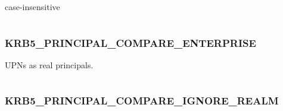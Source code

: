 \documentclass[letterpaper,10pt,english]{sphinxmanual}
\begin{document}
case-insensitive

\begin{tabulary}{\linewidth}{|L|L|}
\hline

 & 
\\
\hline\end{tabulary}



\subsubsection{KRB5\_PRINCIPAL\_COMPARE\_ENTERPRISE}
\label{appdev/refs/macros/KRB5_PRINCIPAL_COMPARE_ENTERPRISE:krb5-principal-compare-enterprise}\label{appdev/refs/macros/KRB5_PRINCIPAL_COMPARE_ENTERPRISE:krb5-principal-compare-enterprise-data}\label{appdev/refs/macros/KRB5_PRINCIPAL_COMPARE_ENTERPRISE::doc}

\begin{fulllineitems}
\label{appdev/refs/macros/KRB5_PRINCIPAL_COMPARE_ENTERPRISE:KRB5_PRINCIPAL_COMPARE_ENTERPRISE}
\end{fulllineitems}


UPNs as real principals.

\begin{tabulary}{\linewidth}{|L|L|}
\hline

 & 
\\
\hline\end{tabulary}



\subsubsection{KRB5\_PRINCIPAL\_COMPARE\_IGNORE\_REALM}
\label{appdev/refs/macros/KRB5_PRINCIPAL_COMPARE_IGNORE_REALM:krb5-principal-compare-ignore-realm}\label{appdev/refs/macros/KRB5_PRINCIPAL_COMPARE_IGNORE_REALM::doc}\label{appdev/refs/macros/KRB5_PRINCIPAL_COMPARE_IGNORE_REALM:krb5-principal-compare-ignore-realm-data}

\begin{fulllineitems}
\label{appdev/refs/macros/KRB5_PRINCIPAL_COMPARE_IGNORE_REALM:KRB5_PRINCIPAL_COMPARE_IGNORE_REALM}
\end{fulllineitems}
\end{document}
